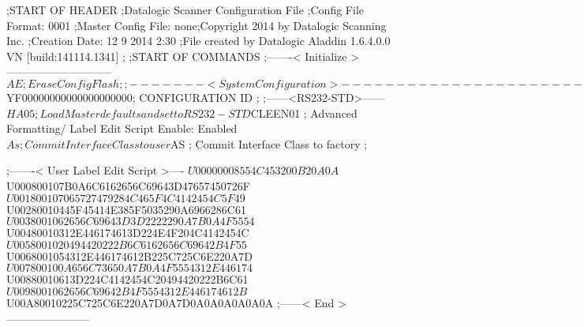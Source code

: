 ;START OF HEADER
;Datalogic Scanner Configuration File
;Config File Format: 0001
;Master Config File: none;Copyright 2014 by Datalogic Scanning Inc.
;Creation Date: 12 9 2014 2:30
;File created by Datalogic Aladdin 1.6.4.0.0 VN [build:141114.1341]
;
;START OF COMMANDS
;-------< Initialize >-----------------------------
$AE                 ; Erase Config Flash
;
;-------< System Configuration >-------------------------------
$YF00000000000000000000; CONFIGURATION ID
;
;------<RS232-STD>------
$HA05               ; Load Master defaults and set to RS232-STD
$CLEEN01            ; Advanced Formatting/ Label Edit Script Enable: Enabled
$As                 ; Commit Interface Class to user
$AS                 ; Commit Interface Class to factory
;

;-------< User Label Edit Script >----
$U00000008554C453200B20A0A
$U000800107B0A6C6162656C69643D47657450726F
$U001800107065727479284C465F4C4142454C5F49
$U00280010445F45414E385F5035290A6966286C61
$U0038001062656C69643D3D2222290A7B0A4F5554
$U00480010312E446174613D224E4F204C4142454C
$U0058001020494420222B6C6162656C69642B4F55
$U0068001054312E446174612B225C725C6E220A7D
$U007800100A656C73650A7B0A4F5554312E446174
$U00880010613D224C4142454C20494420222B6C61
$U0098001062656C69642B4F5554312E446174612B
$U00A80010225C725C6E220A7D0A7D0A0A0A0A0A0A
;------< End >-----------------------
